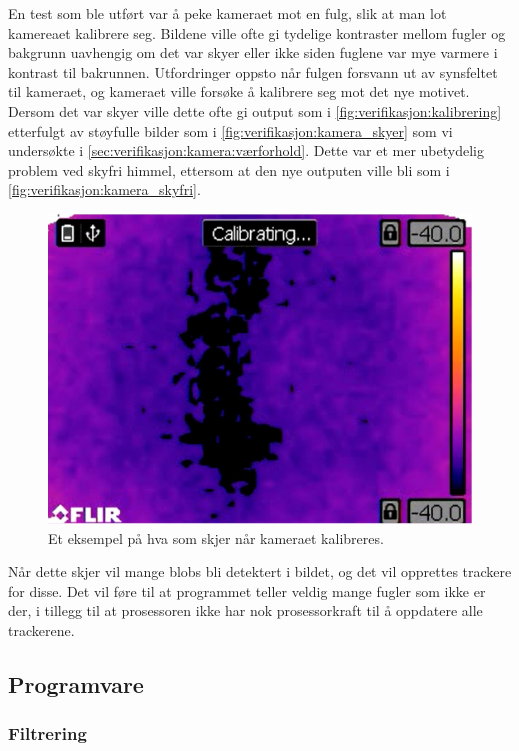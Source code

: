 En test som ble utført var å peke kameraet mot en fulg, slik at man lot kamereaet kalibrere seg. 
Bildene ville ofte gi tydelige kontraster mellom fugler og bakgrunn uavhengig om det var skyer eller ikke siden fuglene var mye varmere i kontrast til bakrunnen. 
Utfordringer oppsto når fulgen forsvann ut av synsfeltet til kameraet, og kameraet ville forsøke å kalibrere seg mot det nye motivet. Dersom det var skyer ville dette ofte gi output som i \autoref{fig:verifikasjon:kalibrering} etterfulgt av støyfulle bilder som i \autoref{fig:verifikasjon:kamera_skyer} som vi undersøkte i \autoref{sec:verifikasjon:kamera:værforhold}. 
Dette var et mer ubetydelig problem ved skyfri himmel, ettersom at den nye outputen ville bli som i \autoref{fig:verifikasjon:kamera_skyfri}.

\begin{figure}[H]
    \centering
    \includegraphics[width=.5\textwidth]{verifikasjon-test/Kamera/kalibrering.jpg}
    \caption{Et eksempel på hva som skjer når kameraet kalibreres.}
    \label{fig:verifikasjon:kalibrering}
\end{figure}
Når dette skjer vil mange blobs bli detektert i bildet, og det vil opprettes trackere for disse. Det vil føre til at programmet teller veldig mange fugler som ikke er der, i tillegg til at prosessoren ikke har nok prosessorkraft til å oppdatere alle trackerene.


\subsection{Programvare}\label{sec:verifikasjon:programvare}

\subsubsection{Filtrering}\label{sec:verifikasjon:programvare:filtrering}

